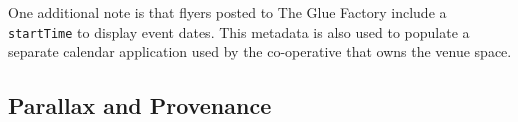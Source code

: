 


One additional note is that flyers posted to The Glue Factory include a \texttt{startTime}
to display event dates.
This metadata is also used to populate a separate calendar application
used by the co-operative that owns the venue space.




\subsection{Parallax and Provenance}


